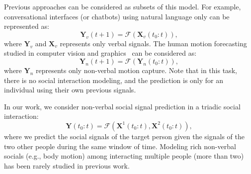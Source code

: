 Previous approaches can be considered as subsets of this model. For example, conversational interfaces (or chatbots) using natural language only can be represented as:
\begin{equation}
\mathbf{Y}_v (t+1) =  \mathcal{F} \left( \mathbf{X}_v (t_0:t) \right),
\end{equation}
where $\mathbf{Y}_v$ and $\mathbf{X}_v$ represents only verbal signals. The human motion forecasting studied in computer vision and graphics~\cite{Fragkiadaki_2015_ICCV, jain2016structural} can be considered as:
\begin{equation}
\mathbf{Y}_n (t+1) =  \mathcal{F} \left( \mathbf{Y}_n (t_0:t) \right),
\end{equation}
where $\mathbf{Y}_n$ represents only non-verbal motion capture. Note that in this task, there is no social interaction modeling, and the prediction is only for an individual using their own previous signals. 

In our work, we consider non-verbal social signal prediction in a triadic social interaction:
\begin{equation}
\mathbf{Y} ( t_0:t ) =  \mathcal{F} \left( \mathbf{X}^1 (t_0:t), \mathbf{X}^2 (t_0:t) \right),
\label{equation:F_ours}
\end{equation}
where we predict the social signals of the target person given the signals of the two other people during the same window of time. Modeling rich non-verbal socials (e.g., body motion) among interacting multiple people (more than two) has been rarely studied in previous work.















